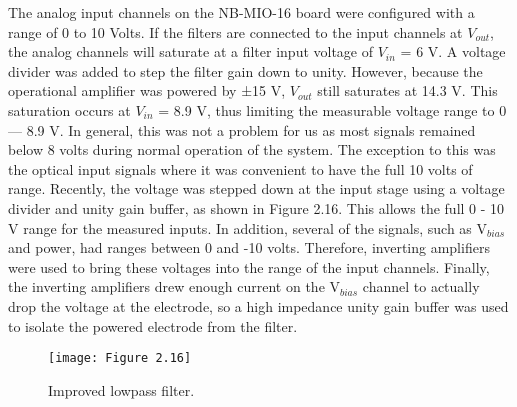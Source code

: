 The analog input channels on the NB-MIO-16 board were configured with a range of 0 to 10 Volts. If the filters are connected to the input channels at $V_{out}$, the analog channels will saturate at a filter input voltage of $V_{in}$ = 6 V. A voltage divider was added to step the filter gain down to unity. However, because the operational amplifier was powered by ±15 V, $V_{out}$ still saturates at 14.3 V. This saturation occurs at $V_{in}$ = 8.9 V, thus limiting the measurable voltage range to 0 — 8.9 V. In general, this was not a problem for us as most signals remained below 8 volts during normal operation of the system. The exception to this was the optical input signals where it was convenient to have the full 10 volts of range. Recently, the voltage was stepped down at the input stage using a voltage divider and unity gain buffer, as shown in Figure 2.16. This allows the full 0 - 10 V range for the measured inputs. In addition, several of the signals, such as $\text{V}_{bias}$ and power, had ranges between 0 and -10 volts. Therefore, inverting amplifiers were used to bring these voltages into the range of the input channels. Finally, the inverting amplifiers drew enough current on the $\text{V}_{bias}$ channel to actually drop the voltage at the electrode, so a high impedance unity gain buffer was used to isolate the powered electrode from the filter.

\begin{figure}[H]
	\centering
	\texttt{[image: Figure 2.16]}
	\bf\caption{  Improved lowpass filter.}
	\label{fig:2.16}
\end{figure}